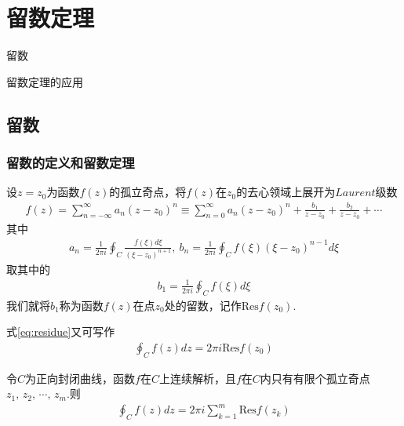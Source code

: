 \chapter{留数定理}

\begin{introduction}
    \item 留数
    \item 留数定理的应用
\end{introduction}

\section{留数}
    \subsection{留数的定义和留数定理}
        设$z=z_0$为函数$f(z)$的孤立奇点，将$f(z)$在$z_0$的去心领域上展开为$Laurent$级数
        \begin{align*}
            f(z)=\sum_{n=-\infty}^{\infty}a_n(z-z_0)^n\equiv \sum_{n=0}^{\infty}a_n(z-z_0)^n + \frac{b_1}{z-z_0}+\frac{b_2}{z-z_0}+\cdots
        \end{align*}
        其中
        \begin{align*}
            a_n=\frac1{2\pi i}\oint_C \frac{f(\xi)d\xi}{(\xi - z_0)^{n+1}},\ b_n=\frac1{2\pi i}\oint_C f(\xi)(\xi - z_0)^{n-1}d\xi
        \end{align*}
        取其中的
        \begin{align}
            \label{eq:residue}
            b_1=\frac1{2\pi i}\oint_C f(\xi)d\xi
        \end{align}
        我们就将$b_1$称为函数$f(z)$在点$z_0$处的留数，记作$\mathrm{Res} f(z_0)$.

        式\ref{eq:residue}又可写作
        \begin{align*}
            \oint_C f(z)dz=2\pi i \mathrm{Res} f(z_0)
        \end{align*}

        \begin{theorem}[留数定理]\label{thm:residue_theorem}
            令$C$为正向封闭曲线，函数$f$在$C$上连续解析，且$f$在$C$内只有有限个孤立奇点$z_1,\,z_2,\,\cdots,\,z_m$.则
            \begin{align*}
                \oint_C f(z)dz=2\pi i\sum_{k=1}^{m}\mathrm{Res}f(z_k)
            \end{align*}
        \end{theorem}

